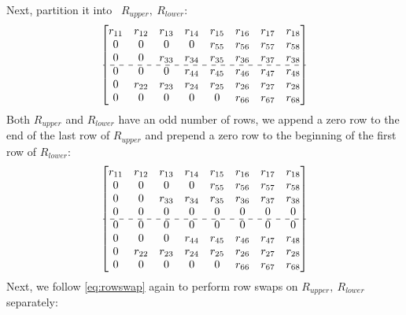 \documentclass[conference]{IEEEtran}
\numberwithin{equation}{section}
\begin{document}
Next, partition it into \ $R_{upper}, \ R_{lower}$:
 \begin{align*}
 \begin{bmatrix}
 r_{11} & r_{12} & r_{13} & r_{14} & r_{15} & r_{16} & r_{17} & r_{18}\\
 0      & 0      & 0      & 0      & r_{55} & r_{56} & r_{57} & r_{58}\\
 0      & 0      & r_{33} & r_{34} & r_{35} & r_{36} & r_{37} & r_{38}\\
 \cdashline{1-8}
 0      & 0      & 0      & r_{44} & r_{45} & r_{46} & r_{47} & r_{48}\\
 0      & r_{22}  & r_{23} & r_{24} & r_{25} & r_{26} & r_{27} & r_{28}\\
 0      & 0      & 0      & 0      & 0      & r_{66} & r_{67} & r_{68}\\
\end{bmatrix}
\end{align*}
 Both \( R_{upper} \) and \( R_{lower} \) have an odd number of rows,
we append a zero row to the end of the last row of \( R_{upper} \) and prepend a zero row to the beginning of the first row of \( R_{lower} \):
\begin{align*}
\begin{bmatrix}
 r_{11} & r_{12} & r_{13} & r_{14} & r_{15} & r_{16} & r_{17} & r_{18}\\
 0      & 0      & 0      & 0      & r_{55} & r_{56} & r_{57} & r_{58}\\
 0      & 0      & r_{33} & r_{34} & r_{35} & r_{36} & r_{37} & r_{38}\\
 0      & 0      & 0      & 0      & 0      & 0      & 0      & 0     \\
 \cdashline{1-8}
 0      & 0      & 0      & 0      & 0      & 0      & 0      & 0     \\
 0      & 0      & 0      & r_{44} & r_{45} & r_{46} & r_{47} & r_{48}\\
 0      & r_{22} & r_{23} & r_{24} & r_{25} & r_{26} & r_{27} & r_{28}\\
 0      & 0      & 0      & 0      & 0      & r_{66} & r_{67} & r_{68}\\
\end{bmatrix} 
\end{align*}
Next, we follow  \eqref{eq:rowswap} again to perform row swaps
on $R_{upper}, \ R_{lower}$ separately:
\end{document}
